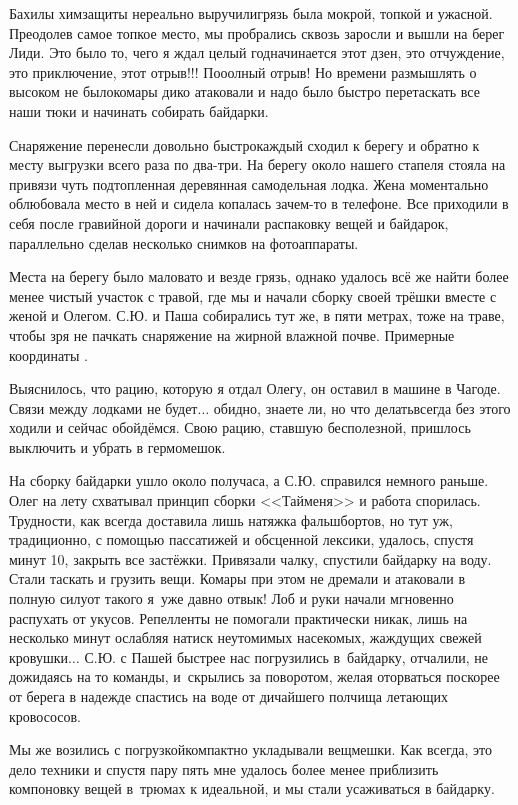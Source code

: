 Бахилы химзащиты нереально выручили\mdash грязь была мокрой, топкой и ужасной. Преодолев самое топкое место, мы пробрались сквозь заросли и вышли на берег Лиди. Это было то, чего я ждал целый год\mdash начинается этот дзен, это отчуждение, это приключение, этот отрыв!!! По\sdash о\sdash олный отрыв! Но времени размышлять о высоком не было\mdash комары дико атаковали и надо было быстро перетаскать все наши тюки и начинать собирать байдарки. 

Снаряжение перенесли довольно быстро\mdash каждый сходил к берегу и обратно к месту выгрузки всего раза по два-три. На берегу около нашего стапеля стояла на привязи чуть подтопленная деревянная самодельная лодка. Жена моментально облюбовала место в ней и сидела копалась зачем-то в телефоне. Все приходили в себя после гравийной дороги и начинали распаковку вещей и байдарок, параллельно сделав несколько снимков на фотоаппараты. 

Места на берегу было маловато и везде грязь, однако удалось всё же найти более менее чистый участок с травой, где мы и начали сборку своей трёшки вместе с женой и Олегом. С.Ю. и Паша собирались тут же, в пяти метрах, тоже на траве, чтобы зря не пачкать снаряжение на жирной влажной почве. Примерные координаты \CoordsLidSeventeenStapel.

Выяснилось, что рацию, которую я отдал Олегу, он оставил в машине в Чагоде. Связи между лодками не будет$\ldots$ обидно, знаете ли, но что делать\mdash всегда без этого ходили и сейчас обойдёмся. Свою рацию, ставшую бесполезной, пришлось выключить и убрать в гермомешок.

На сборку байдарки ушло около получаса, а С.Ю. справился немного раньше. Олег на лету схватывал принцип сборки <<Тайменя>> и работа спорилась. Трудности, как всегда доставила лишь натяжка фальшбортов, но тут уж, традиционно, с помощью пассатижей и обсценной лексики, удалось, спустя минут 10, закрыть все застёжки. Привязали чалку, спустили байдарку на воду. Стали таскать и грузить вещи. Комары при этом не дремали и атаковали в полную силу\mdash от такого я~уже давно отвык! Лоб и руки начали мгновенно распухать от укусов. Репелленты не помогали практически никак, лишь на несколько минут ослабляя натиск неутомимых насекомых, жаждущих свежей кровушки$\ldots$ С.Ю. с Пашей быстрее нас погрузились в~байдарку, отчалили, не дожидаясь на то команды, и~скрылись за поворотом, желая оторваться поскорее от берега в надежде спастись на воде от дичайшего полчища летающих кровососов.

Мы же возились с погрузкой\mdash компактно укладывали вещмешки. Как всегда, это дело техники и спустя пару пять мне удалось более менее приблизить компоновку вещей в~трюмах к идеальной, и мы стали усаживаться в байдарку. 

